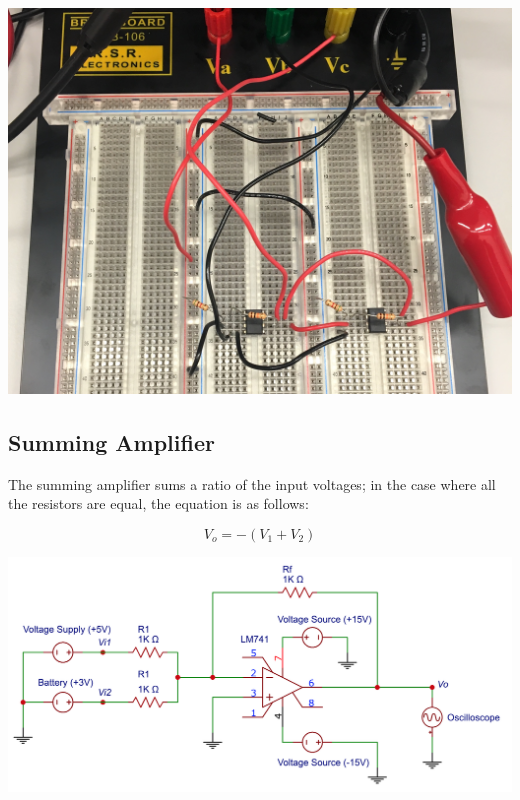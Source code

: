 \documentclass[journal]{IEEEtran}
\begin{document}
\begingroup
    \centering
    \bigskip
    \includegraphics[width=\columnwidth]{images/lab7_cascading_circuit.jpg}
    \label{fig:cascade_circ}
    \medskip
\endgroup

\subsection{Summing Amplifier}
\noindent The summing amplifier sums a ratio of the input voltages; in the case where all the resistors are equal, the equation is as follows:

\begin{equation}
V_o = -(V_1+V_2)
\label{eq:summing}
\end{equation}

\begingroup
    \centering
    \medskip
    \includegraphics[width=\columnwidth]{images/lab7_summing.png}
    \label{fig:summing}
    \medskip
\endgroup
\end{document}
